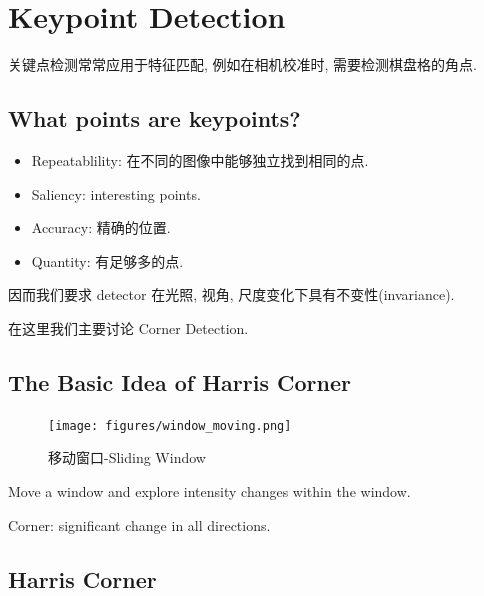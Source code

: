 \section{Keypoint Detection}

关键点检测常常应用于特征匹配, 例如在相机校准时, 需要检测棋盘格的角点. 
\subsection{What points are keypoints?}
\begin{itemize}
    \item Repeatablility: 在不同的图像中能够独立找到相同的点.
    \item Saliency: interesting points.
    \item Accuracy: 精确的位置.
    \item Quantity: 有足够多的点.
\end{itemize}

因而我们要求 detector 在光照, 视角, 尺度变化下具有不变性(invariance).

在这里我们主要讨论 Corner Detection.

\subsection{The Basic Idea of Harris Corner}

\begin{figure}[htbp]
    \centering
    \texttt{[image: figures/window\_moving.png]}
    \caption{移动窗口-Sliding Window}    
\end{figure}

Move a window and explore intensity changes within the window.

Corner: significant change in all directions.

\subsection{Harris Corner}

